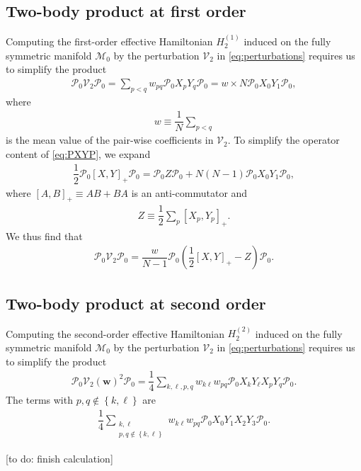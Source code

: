 \documentclass[nofootinbib,notitlepage,11pt]{revtex4-2}
\newcommand{\f}[2]{\dfrac{#1}{#2}} %
\newcommand{\p}[1]{\left(#1\right)} %
\renewcommand{\sp}[1]{\left[#1\right]} %
\renewcommand{\set}[1]{\left\{#1\right\}} %
\newcommand{\m}{\bm} %
\newcommand{\1}{\mathds{1}}
\newcommand{\M}{\mathcal{M}}
\renewcommand{\P}{\mathcal{P}}
\newcommand{\V}{\mathcal{V}}
\newcommand{\red}[1]{{\color{red} #1}}
\begin{document}
\subsection{Two-body product at first order}
\label{sec:PXYP}

Computing the first-order effective Hamiltonian $H_2^{(1)}$ induced on
the fully symmetric manifold $\M_0$ by the perturbation $\V_2$ in
\eqref{eq:perturbations} requires us to simplify the product
\begin{align}
  \P_0 \V_2 \P_0
  = \sum_{p<q} w_{pq} \P_0 X_p Y_q \P_0
  = w \times N \P_0 X_0 Y_1 \P_0,
  \label{eq:PXYP}
\end{align}
where
\begin{align}
  w \equiv \f1N \sum_{p<q}
\end{align}
is the mean value of the pair-wise coefficients in $\V_2$.  To
simplify the operator content of \eqref{eq:PXYP}, we expand
\begin{align}
  \f12 \P_0 \sp{X, Y}_+ \P_0
  = \P_0 Z \P_0 + N\p{N-1} \P_0 X_0 Y_1 \P_0,
\end{align}
where $\sp{A,B}_+\equiv AB+BA$ is an anti-commutator and
\begin{align}
  Z \equiv \f12 \sum_p \sp{X_p,Y_p}_+.
\end{align}
We thus find that
\begin{align}
  \P_0 \V_2 \P_0
  = \f{w}{N-1} \P_0 \p{\f12 \sp{X,Y}_+ -  Z } \P_0.
\end{align}

\subsection{Two-body product at second order}
\label{sec:PVVP_2}

Computing the second-order effective Hamiltonian $H_2^{(2)}$ induced
on the fully symmetric manifold $\M_0$ by the perturbation $\V_2$ in
\eqref{eq:perturbations} requires us to simplify the product
\begin{align}
  \P_0 \V_2\p{\m w}^2 \P_0
  = \f14 \sum_{k,\ell,p,q} w_{k\ell} w_{pq} \P_0 X_k Y_\ell X_p Y_q \P_0.
\end{align}
The terms with $p,q\notin\set{k,\ell}$ are
\begin{align}
  \f14 \sum_{\substack{k,\ell\\p,q\notin\set{k,\ell}}} w_{k\ell} w_{pq}
  \P_0 X_0 Y_1 X_2 Y_3 \P_0.
\end{align}


\red{[to do: finish calculation]}


\end{document}
